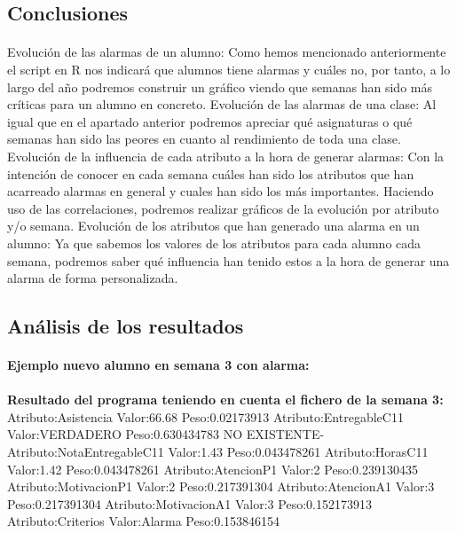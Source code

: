 
\subsection{Conclusiones}
\paragraph{}

Evolución de las alarmas de un alumno: Como hemos mencionado
anteriormente el script en R nos indicará que alumnos tiene alarmas y
cuáles no, por tanto, a lo largo del año podremos construir un gráfico
viendo que semanas han sido más críticas para un alumno en concreto.
Evolución de las alarmas de una clase: Al igual que en el apartado
anterior podremos apreciar qué asignaturas o qué semanas han sido las
peores en cuanto al rendimiento de toda una clase.  Evolución de la
influencia de cada atributo a la hora de generar alarmas: Con la
intención de conocer en cada semana cuáles han sido los atributos que
han acarreado alarmas en general y cuales han sido los más
importantes. Haciendo uso de las correlaciones, podremos realizar
gráficos de la evolución por atributo y/o semana.  Evolución de los
atributos que han generado una alarma en un alumno: Ya que sabemos los
valores de los atributos para cada alumno cada semana, podremos saber
qué influencia han tenido estos a la hora de generar una alarma de
forma personalizada.

\subsection{Análisis de los resultados}
\paragraph{}
\textbf{Ejemplo nuevo alumno en semana 3 con alarma:}

\paragraph{}
\paragraph{}
\textbf{Resultado del programa teniendo en cuenta el fichero de la
  semana 3:} Atributo:Asistencia Valor:66.68 Peso:0.02173913
Atributo:EntregableC11 Valor:VERDADERO Peso:0.630434783 NO
EXISTENTE-Atributo:NotaEntregableC11 Valor:1.43 Peso:0.043478261
Atributo:HorasC11 Valor:1.42 Peso:0.043478261 Atributo:AtencionP1
Valor:2 Peso:0.239130435 Atributo:MotivacionP1 Valor:2
Peso:0.217391304 Atributo:AtencionA1 Valor:3 Peso:0.217391304
Atributo:MotivacionA1 Valor:3 Peso:0.152173913 Atributo:Criterios
Valor:Alarma Peso:0.153846154

